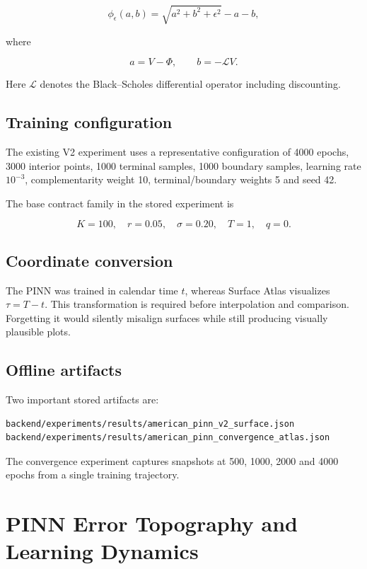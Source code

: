 \documentclass[11pt,a4paper]{article}
\begin{document}
\[
\phi_\epsilon(a,b)
=\sqrt{a^2+b^2+\epsilon^2}-a-b,
\]

where

\[
a=V-\Phi,
\qquad
b=-\mathcal{L}V.
\]

Here \(\mathcal{L}\) denotes the Black--Scholes differential operator including discounting.

\subsection{Training configuration}

The existing V2 experiment uses a representative configuration of 4000 epochs, 3000 interior points, 1000 terminal samples, 1000 boundary samples, learning rate \(10^{-3}\), complementarity weight 10, terminal/boundary weights 5 and seed 42.

The base contract family in the stored experiment is

\[
K=100,\quad r=0.05,\quad \sigma=0.20,\quad T=1,\quad q=0.
\]

\subsection{Coordinate conversion}

The PINN was trained in calendar time \(t\), whereas Surface Atlas visualizes \(\tau=T-t\). This transformation is required before interpolation and comparison. Forgetting it would silently misalign surfaces while still producing visually plausible plots.

\subsection{Offline artifacts}

Two important stored artifacts are:

\begin{lstlisting}
backend/experiments/results/american_pinn_v2_surface.json
backend/experiments/results/american_pinn_convergence_atlas.json
\end{lstlisting}

The convergence experiment captures snapshots at 500, 1000, 2000 and 4000 epochs from a single training trajectory.

\section{PINN Error Topography and Learning Dynamics}
\end{document}
